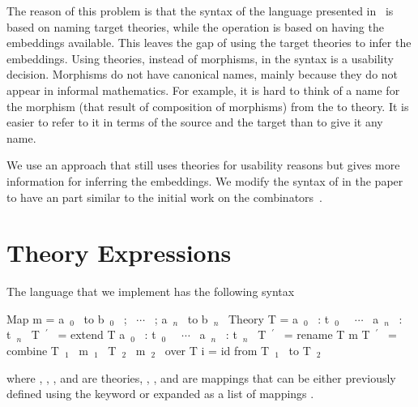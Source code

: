 The reason of this problem is that the syntax of the language presented in~\cite{carette2018building} is based on naming target theories, while the operation is based on having the embeddings available. This leaves the gap of using the target theories to infer the embeddings. Using theories, instead of morphisms, in the syntax is a usability decision. Morphisms do not have canonical names, mainly because they do not appear in informal mathematics. For example, it is hard to think of a name for the morphism (that result of composition of morphisms) from the  to  theory. It is easier to refer to it in terms of the source and the target than to give it any name. 

We use an approach that still uses theories for usability reasons but gives more information for inferring the embeddings. We modify the syntax of  in the paper to have an  part similar to the initial work on the combinators~\cite{CaretteOConnorTPC}. 

\begin{comment}
\subsection{All Paths Commute Approach} 
\ednote{@JC: Do we need to remove mixin, so all paths commute?} 
When referring to a morphism using its source and target, we implicitly assume that all paths commute, i.e.: Given the source and target, they either is no path, one path, or multiple paths that commute between them. 

In Section~\ref{sec:background:morphisms}, we discussed the three types of morphisms, identity, embeddings and general morphisms. We also noted in Section~\ref{subsec:mixin} that the only combinator that accepts and generates a general morphism is \lstmath{mixin}. If we restrict our language to \lstmath{extension}, \lstmath{rename}, and \lstmath{combine}, we end up with an all-embeddings graph, in which all paths commute. 
\end{comment}

\section{Theory Expressions}
\label{sec:impl:expressions}
The language that we implement has the following syntax
\begin{togcode}
 Map m = {a~$_0$~ to b~$_0$~ ; ~$\cdots$~ ; a~$_n$~ to b~$_n$~}
 Theory T = {a~$_0$~ : t~$_0$~ ~$\cdots$~ a~$_n$~ : t~$_n$~}
 T~$^\prime$~ = extend T {a~$_0$~ : t~$_0$~ ~$\cdots$~ a~$_n$~ : t~$_n$~}
 T~$^\prime$~ = rename T m 
 T~$^\prime$~ = combine T~$_1$~ m~$_1$~ T~$_2$~ m~$_2$~ over T
 i = id from T~$_1$~ to T~$_2$~
\end{togcode} 
\noindent where , , , and  are theories, , , and  are mappings that can be  either previously defined using the  keyword or expanded as a list of mappings 
. 

